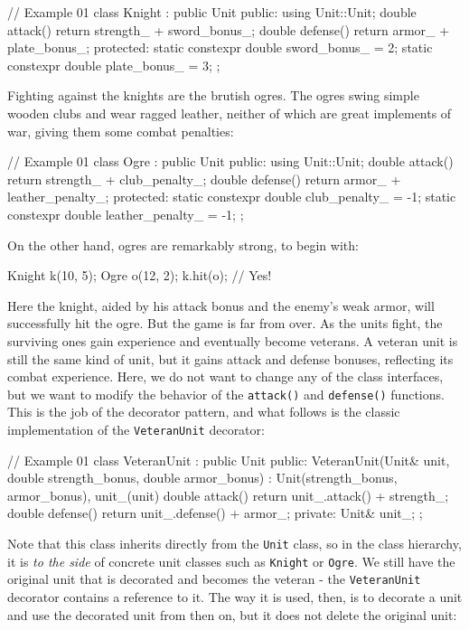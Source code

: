 \begin{code}
// Example 01
class Knight : public Unit {
  public:
  using Unit::Unit;
  double attack() { return strength_ + sword_bonus_; }
  double defense() { return armor_ + plate_bonus_; }
  protected:
  static constexpr double sword_bonus_ = 2;
  static constexpr double plate_bonus_ = 3;
};
\end{code}

Fighting against the knights are the brutish ogres. The ogres swing simple wooden clubs and wear ragged leather, neither of which are great implements of war, giving them some combat penalties:

\begin{code}
// Example 01
class Ogre : public Unit {
  public:
  using Unit::Unit;
  double attack() { return strength_ + club_penalty_; }
  double defense() { return armor_ + leather_penalty_; }
  protected:
  static constexpr double club_penalty_ = -1;
  static constexpr double leather_penalty_ = -1;
};
\end{code}

On the other hand, ogres are remarkably strong, to begin with:

\begin{code}
Knight k(10, 5);
Ogre o(12, 2);
k.hit(o); // Yes!
\end{code}

Here the knight, aided by his attack bonus and the enemy's weak armor, will successfully hit the ogre. But the game is far from over. As the units fight, the surviving ones gain experience and eventually become veterans. A veteran unit is still the same kind of unit, but it gains attack and defense bonuses, reflecting its combat experience. Here, we do not want to change any of the class interfaces, but we want to modify the behavior of the \texttt{attack()} and \texttt{defense()} functions. This is the job of the decorator pattern, and what follows is the classic implementation of the \texttt{VeteranUnit} decorator:

\begin{code}
// Example 01
class VeteranUnit : public Unit {
  public:
  VeteranUnit(Unit& unit,
              double strength_bonus,
              double armor_bonus) :
    Unit(strength_bonus, armor_bonus), unit_(unit) {}
  double attack() { return unit_.attack() + strength_; }
  double defense() { return unit_.defense() + armor_; }
  private:
  Unit& unit_;
};
\end{code}

Note that this class inherits directly from the \texttt{Unit} class, so in the class hierarchy, it is \emph{to the side} of concrete unit classes such as \texttt{Knight} or \texttt{Ogre}. We still have the original unit that is decorated and becomes the veteran - the \texttt{VeteranUnit} decorator contains a reference to it. The way it is used, then, is to decorate a unit and use the decorated unit from then on, but it does not delete the original unit:


